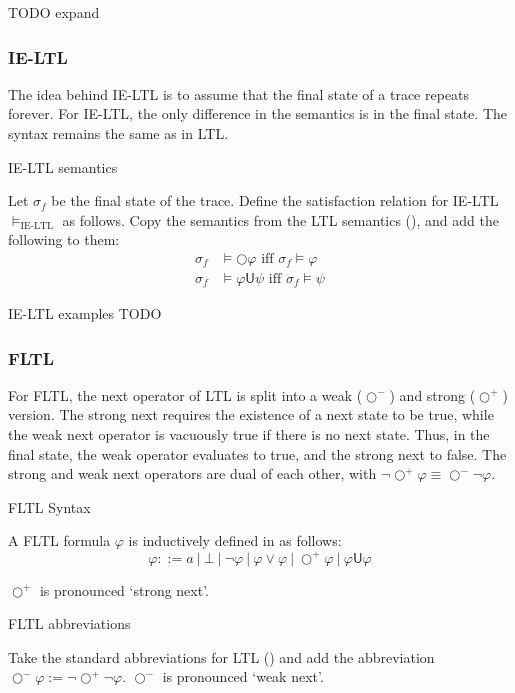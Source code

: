 \documentclass[a4paper]{article}
\newcommand{\U}{\mathsf{U}}
\newcommand{\tiff}{\text{ iff }}
\newcommand{\sn}{\bigcirc^+}
\newcommand{\wn}{\bigcirc^-}
\begin{document}
TODO expand

\subsubsection{IE-LTL} The idea behind IE-LTL is to assume that the final state of a trace repeats forever. For IE-LTL, the only difference in the semantics is in the final state. The syntax remains the same as in LTL.
\begin{defn}{IE-LTL semantics}

  Let $\sigma_f$ be the final state of the trace. Define the satisfaction relation for IE-LTL $\vDash_{\text{IE-LTL}}$ as follows. Copy the semantics from the LTL semantics (), and add the following to them:
  \begin{align*}
    \sigma_f &\vDash \bigcirc \varphi \tiff \sigma_f \vDash \varphi\\
    \sigma_f &\vDash \varphi \U \psi \tiff \sigma_f \vDash \psi
  \end{align*}
\end{defn}

\begin{eg}{IE-LTL examples}
  TODO
\end{eg}


\subsubsection{FLTL} For FLTL, the next operator of LTL is split into a weak ($\wn$) and strong ($\sn$) version.
The strong next requires the existence of a next state to be true, while the weak next operator is vacuously true if there is no next state.
Thus, in the final state, the weak operator evaluates to true, and the strong next to false. The strong and weak next operators are dual of each other, with  $\neg\sn\varphi \equiv \wn\neg\varphi$.

\begin{defn}{FLTL Syntax}

  A FLTL formula $\varphi$ is inductively defined in as follows:
  \[\varphi ::= a ~|~ \bot ~|~ \neg \varphi ~|~\varphi \lor \varphi ~|~ \sn \varphi ~|~ \varphi \U\varphi\]

  $\sn$ is pronounced `strong next'.
\end{defn}

\begin{notn}{FLTL abbreviations}\label{fltlabbrev}

  Take the standard abbreviations for LTL () and add the abbreviation $\wn \varphi:= \neg \sn \neg \varphi$. $\wn$ is pronounced `weak next'.
\end{notn}
\end{document}
